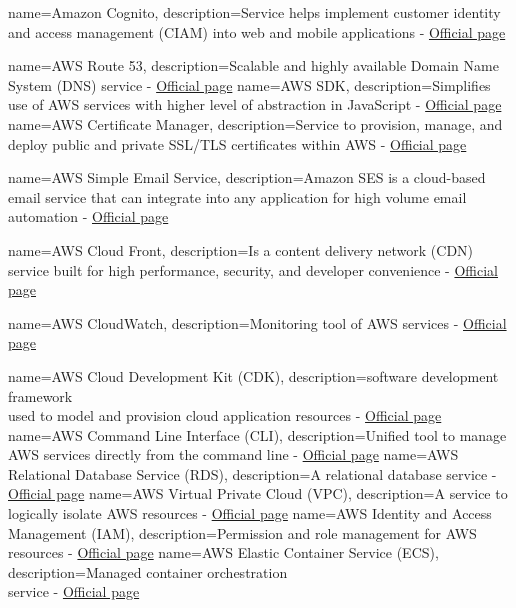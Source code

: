 {
        name=Amazon Cognito,
        description={Service helps implement customer identity and access management (CIAM) into web and mobile applications - \href{https://aws.amazon.com/cognito/}{Official page}}
}

{
        name=AWS Route 53,
        description={Scalable and highly available Domain Name System (DNS) service - \href{https://aws.amazon.com/route53/}{Official page}}
}
{
        name=AWS SDK,
        description={Simplifies use of AWS services with higher level of abstraction in JavaScript - \href{https://aws.amazon.com/sdk-for-javascript/}{Official page}}
}
{
        name=AWS Certificate Manager,
        description={Service to provision, manage, and deploy public and private SSL/TLS certificates within AWS - \href{https://aws.amazon.com/certificate-manager/}{Official page}}
}

{
        name=AWS Simple Email Service,
        description={Amazon SES is a cloud-based email service that can integrate into any application for high volume email automation - \href{https://aws.amazon.com/ses/}{Official page}}
}

{
        name=AWS Cloud Front,
        description={Is a content delivery network (CDN) service built for high performance, security, and developer convenience - \href{https://aws.amazon.com/cloudfront/}{Official page}}
}

{
        name=AWS CloudWatch,
        description={Monitoring tool of AWS services - \href{https://www.google.com/search?client=safari&rls=en&q=aws+cloudwatch&ie=UTF-8&oe=UTF-8}{Official page}}
}

{
        name=AWS Cloud Development Kit (CDK),
        description={software development framework \\ used to model and provision cloud application resources  - \href{https://aws.amazon.com/cdk/}{Official page}}
}
{
        name=AWS Command Line Interface (CLI),
        description={Unified tool to manage AWS services directly from the command line - \href{https://aws.amazon.com/cli/}{Official page}}
}
{
        name=AWS Relational Database Service (RDS),
        description={A relational database service - \href{https://aws.amazon.com/rds/}{Official page}}
}
{
        name=AWS Virtual Private Cloud (VPC),
        description={A service to logically isolate AWS resources - \href{https://docs.aws.amazon.com/vpc/latest/userguide/what-is-amazon-vpc.html}{Official page}}
}
{
        name=AWS Identity and Access Management (IAM),
        description={Permission and role management for AWS resources - \href{https://aws.amazon.com/iam/}{Official page}}
}
{
        name=AWS Elastic Container Service (ECS),
        description={Managed container orchestration \\ service - \href{https://aws.amazon.com/ecs/}{Official page}}
}

